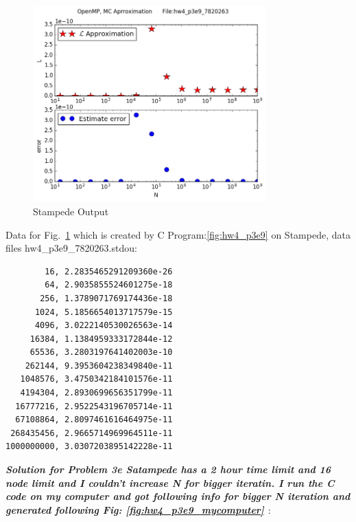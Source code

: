 \documentclass{article}
\begin{document}
\newpage

\begin{figure}[htb]
	\begin{center}
		\includegraphics[width=0.8\textwidth]{hw4_p3e9_7820263.png}
	\end{center}
	\caption{Stampede Output}
	\label{fig:hw4_p3e9_7820263}
\end{figure}

Data for Fig.\ \ref{fig:hw4_p3e9_7820263}  which is created by C Program:\ref{fig:hw4_p3e9}  on Stampede, data files hw4\_p3e9\_7820263.stdou: 
\begin{lstlisting}
        16, 2.2835465291209360e-26 
        64, 2.9035855524601275e-18 
       256, 1.3789071769174436e-18 
      1024, 5.1856654013717579e-15 
      4096, 3.0222140530026563e-14 
     16384, 1.1384959333172844e-12 
     65536, 3.2803197641402003e-10 
    262144, 9.3953604238349840e-11 
   1048576, 3.4750342184101576e-11 
   4194304, 2.8930699656351799e-11 
  16777216, 2.9522543196705714e-11 
  67108864, 2.8097461616464975e-11 
 268435456, 2.9665714969964511e-11 
1000000000, 3.0307203895142228e-11 
\end{lstlisting}



\newpage
\textbf{\textit{Solution for Problem 3e
Satampede has a 2 hour time  limit and 16 node limit and I couldn't increase N for bigger iteratin.
I run the C code on my computer and got following info for bigger N iteration and generated following Fig:{ \ref{fig:hw4_p3e9_mycomputer} }   }} :

\begin{lstlisting}
 \end{lstlisting}
\end{document}

